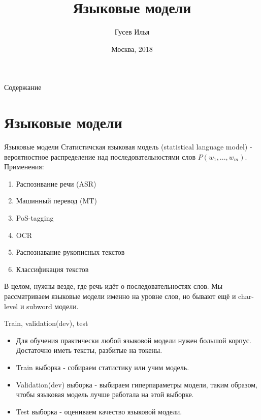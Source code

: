 \documentclass[10pt]{beamer}
\title[Ввдение в обработку естественных языков]{Языковые модели}
\author[Гусев Илья]{Гусев Илья}
\institute[МФТИ] 
{Московский физико-технический институт\\*}
\date{Москва, 2018}
\begin{document}
\begin{frame}
  \titlepage
\end{frame}

\begin{frame}{Содержание}
\tableofcontents
\end{frame}

\section{Языковые модели}

\begin{frame}{Языковые модели}
Статистичская языковая модель (statistical language model) - вероятностное распределение над последовательностями слов $P(w_1, ..., w_m)$.\\
Применения:
\begin{enumerate}
    \item Распознвание речи (ASR)
    \item Машинный перевод (MT)
    \item PoS-tagging
    \item OCR
    \item Распознавание рукописных текстов
    \item Классификация текстов
\end{enumerate}
В целом, нужны везде, где речь идёт о последовательностях слов. Мы рассматриваем языковые модели именно на уровне слов, но бывают ещё и char-level и subword модели.
\end{frame}

\begin{frame}{Train, validation(dev), test}
\begin{itemize}
    \item Для обучения практически любой языковой модели нужен большой корпус. Достаточно иметь тексты, разбитые на токены. \\
    \item Train выборка - собираем статистику или учим модель.\\
    \item Validation(dev) выборка - выбираем гиперпараметры модели, таким образом, чтобы языковая модель лучше работала на этой выборке.\\
    \item Test выборка - оцениваем качество языковой модели. \\
\end{itemize}
\end{frame}
\end{document}

